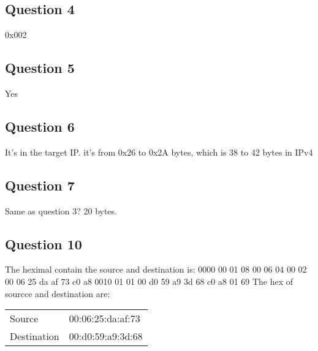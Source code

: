 \documentclass{article}
\begin{document}
\subsection{Question 4}

0x002

\subsection{Question 5}

Yes

\subsection{Question 6}

It's in the target IP. it's from 0x26 to 0x2A bytes, which is 38 to 42 bytes in IPv4

\subsection{Question 7}

Same as question 3? 20 bytes.

\subsection{Question 10}
The heximal contain the source and destination is:
0000   00 01 08 00 06 04 00 02 00 06 25 da af 73 c0 a8
0010   01 01 00 d0 59 a9 3d 68 c0 a8 01 69
The hex of sourcce and destination are:
\begin{tabular}{l l}
    Source & 00:06:25:da:af:73 \\
    Destination & 00:d0:59:a9:3d:68 \\
\end{tabular}
\end{document}
